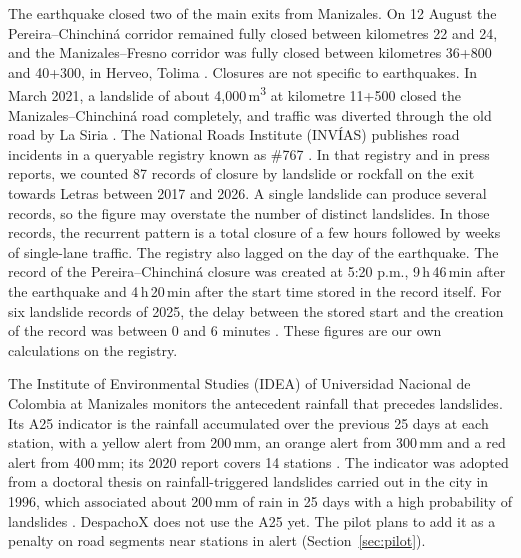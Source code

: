 \documentclass[11pt]{article}
\begin{document}
The earthquake closed two of the main exits from Manizales. On 12 August the Pereira--Chinchiná corridor remained fully closed between kilometres 22 and 24, and the Manizales--Fresno corridor was fully closed between kilometres 36+800 and 40+300, in Herveo, Tolima \citep{semana2026vias}. %
Closures are not specific to earthquakes. In March 2021, a landslide of about 4,000\,m\textsuperscript{3} at kilometre 11+500 closed the Manizales--Chinchiná road completely, and traffic was diverted through the old road by La Siria \citep{ani2021cierre}. The National Roads Institute (INVÍAS) publishes road incidents in a queryable registry known as \#767 \citep{invias767}. In that registry and in press reports, we counted 87 records of closure by landslide or rockfall on the exit towards Letras between 2017 and 2026. A single landslide can produce several records, so the figure may overstate the number of distinct landslides. In those records, the recurrent pattern is a total closure of a few hours followed by weeks of single-lane traffic. The registry also lagged on the day of the earthquake. The record of the Pereira--Chinchiná closure was created at 5:20 p.m., 9\,h\,46\,min after the earthquake and 4\,h\,20\,min after the start time stored in the record itself. For six landslide records of 2025, the delay between the stored start and the creation of the record was between 0 and 6 minutes \citep{invias767}. These figures are our own calculations on the registry. %

The Institute of Environmental Studies (IDEA) of Universidad Nacional de Colombia at Manizales monitors the antecedent rainfall that precedes landslides. Its A25 indicator is the rainfall accumulated over the previous 25 days at each station, with a yellow alert from 200\,mm, an orange alert from 300\,mm and a red alert from 400\,mm; its 2020 report covers 14 stations \citep{idea2020a25}. The indicator was adopted from a doctoral thesis on rainfall-triggered landslides carried out in the city in 1996, which associated about 200\,mm of rain in 25 days with a high probability of landslides \citep{idea2018boletin145,terlien1996modelling}. DespachoX does not use the A25 yet. The pilot plans to add it as a penalty on road segments near stations in alert (Section~\ref{sec:pilot}).
\end{document}
